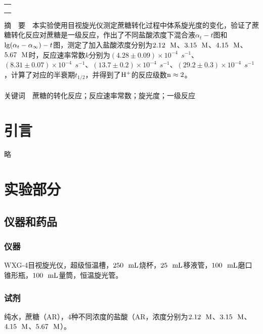 \documentclass[12pt]{article}
\begin{document}
\begin{titlepage}
\begin{center}
            \begin{tabular*}{\textwidth}{c}
                \\ %
                \\ %
                \\ %
                \\ %
                \hline %
            \end{tabular*}
        \end{center}
        \textsf{摘\ \ 要}\ \ 本实验使用目视旋光仪测定蔗糖转化过程中体系旋光度的变化，验证了蔗糖转化反应对蔗糖是一级反应，作出了不同盐酸浓度下混合液$\alpha_{t}-t$图和${\rm lg}(\alpha_{t}-\alpha_{\infty})-t$图，测定了加入盐酸浓度分别为$2.12\ \ {\rm M}$、$3.15\ \ {\rm M}$、$4.15\ \ {\rm M}$、$5.67\ \ {\rm M}$时，反应速率常数$k$分别为$(4.28\pm 0.09)\times10^{-4}\ \ s^{-1}$、$(8.31\pm 0.07)\times10^{-4}\ \ s^{-1}$、$(13.7\pm 0.2)\times10^{-4}\ \ s^{-1}$、$(29.2\pm 0.3)\times10^{-4}\ \ s^{-1}$，计算了对应的半衰期$t_{1/2}$，并得到了$\rm H^{+}$的反应级数$\rm n\approx2$。
        \\
        \\
        \textsf{关键词}\ \ 蔗糖的转化反应；反应速率常数；旋光度；一级反应
    \end{titlepage}

    \section{引言}
	略
               
\vbox{}        
    \section{实验部分}
    	\subsection{仪器和药品}
    	\subsubsection{仪器}
    	WXG-4目视旋光仪，超级恒温槽，$250\ \ {\rm mL}$烧杯，$25\ \ {\rm mL}$移液管，$100\ \ {\rm mL}$磨口锥形瓶，$100\ \ {\rm mL}$量筒，恒温旋光管。
    	\subsubsection{试剂}
    	纯水，蔗糖（AR），$4$种不同浓度的盐酸（AR，浓度分别为$2.12\ \ {\rm M}$、$3.15\ \ {\rm M}$、$4.15\ \ {\rm M}$、$5.67\ \ {\rm M}$）。
\vbox{}
\end{document}
